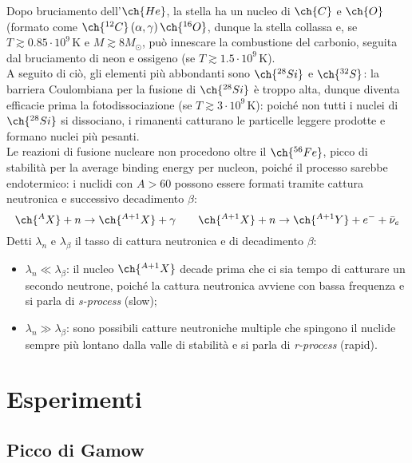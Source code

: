 Dopo bruciamento dell'$ \ch{He} $, la stella ha un nucleo di $ \ch{C} $ e $ \ch{O} $ (formato come $ \ch{^{12}C} \left( \alpha, \gamma \right) \ch{^{16}O} $, dunque la stella collassa e, se $ T \gtrsim 0.85 \cdot 10^9 \,\text{K} $ e $ M \gtrsim 8 M_\odot $, può innescare la combustione del carbonio, seguita dal bruciamento di neon e ossigeno (se $ T \gtrsim 1.5 \cdot 10^9 \,\text{K} $).\\
A seguito di ciò, gli elementi più abbondanti sono $ \ch{^{28}Si} $ e $ \ch{^{32}S} $: la barriera Coulombiana per la fusione di $ \ch{^{28}Si} $ è troppo alta, dunque diventa efficacie prima la fotodissociazione (se $ T \gtrsim 3 \cdot 10^9 \,\text{K} $): poiché non tutti i nuclei di $ \ch{^{28}Si} $ si dissociano, i rimanenti catturano le particelle leggere prodotte e formano nuclei più pesanti.\\
Le reazioni di fusione nucleare non procedono oltre il $ \ch{^{56}Fe} $, picco di stabilità per la average binding energy per nucleon, poiché il processo sarebbe endotermico: i nuclidi con $ A > 60 $ possono essere formati tramite cattura neutronica e successivo decadimento $ \beta $:
\begin{equation*}
	\ch{^A X} + n \rightarrow \ch{^{A+1} X} + \gamma
	\qquad
	\ch{^{A+1} X} + n \rightarrow \ch{^{A+1} Y} + e^- + \bar{\nu}_e
\end{equation*}
Detti $ \lambda_n $ e $ \lambda_\beta $ il tasso di cattura neutronica e di decadimento $ \beta $:
\begin{itemize}
	\item $ \lambda_n \ll \lambda_\beta $: il nucleo $ \ch{^{A+1} X} $ decade prima che ci sia tempo di catturare un secondo neutrone, poiché la cattura neutronica avviene con bassa frequenza e si parla di \textit{s-process} (slow);
	\item $ \lambda_n \gg \lambda_\beta $: sono possibili catture neutroniche multiple che spingono il nuclide sempre più lontano dalla valle di stabilità e si parla di \textit{r-process} (rapid).
\end{itemize}

\section{Esperimenti}

\subsection{Picco di Gamow}

